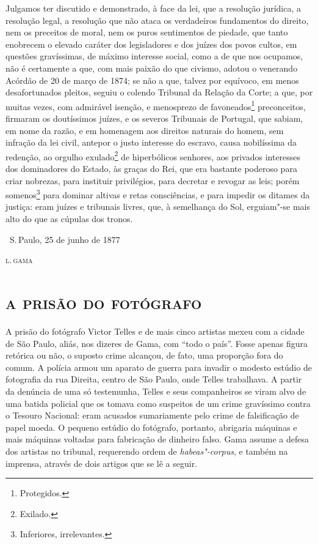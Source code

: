 Julgamos ter discutido e demonstrado, à face da lei, que a resolução
jurídica, a resolução legal, a resolução que não ataca os verdadeiros
fundamentos do direito, nem os preceitos de moral, nem os puros
sentimentos de piedade, que tanto enobrecem o elevado caráter dos
legisladores e dos juízes dos povos cultos, em questões gravíssimas, de
máximo interesse social, como a de que nos ocupamos, não é certamente a
que, com mais paixão do que civismo, adotou o venerando Acórdão de 20 de
março de 1874; se não a que, talvez por equívoco, em menos
desafortunados pleitos, seguiu o colendo Tribunal da Relação da Corte; a
que, por muitas vezes, com admirável isenção, e menosprezo de
favoneados\footnote{Protegidos.} preconceitos, firmaram os doutíssimos
juízes, e os severos Tribunais de Portugal, que sabiam, em nome da
razão, e em homenagem aos direitos naturais do homem, sem infração da
lei civil, antepor o justo interesse do escravo, causa nobilíssima da
redenção, ao orgulho exulado\footnote{Exilado.} de hiperbólicos
senhores, aos privados interesses dos dominadores do Estado, às graças
do Rei, que era bastante poderoso para criar nobrezas, para instituir
privilégios, para decretar e revogar as leis; porém somenos\footnote{
  Inferiores, irrelevantes.}
para dominar altivas e
retas consciências, e para impedir os ditames da justiça: eram juízes e
tribunais livres, que, à semelhança do Sol, erguiam"-se mais alto do que
as cúpulas dos tronos.

\bigskip

\hfill\ S.\,Paulo, 25 de junho de 1877\smallskip

\hfill\textsc{l.\,gama}

\pagebreak
\thispagestyle{empty}
\movetooddpage
\thispagestyle{empty}


\begingroup\makeatletter\@openrightfalse
\part{\textsc{a prisão do fotógrafo}}

\mbox{}\vfill
\thispagestyle{empty}
{\footnotesize\noindent
A prisão do fotógrafo Victor Telles e de mais cinco artistas mexeu
com a cidade de São Paulo, aliás, nos dizeres de Gama, com ``todo o
país''. Fosse apenas figura retórica ou não, o suposto crime alcançou, de
fato, uma proporção fora do comum. A polícia armou um aparato de guerra
para invadir o modesto estúdio de fotografia da rua Direita, centro de
São Paulo, onde Telles trabalhava. A partir da denúncia de uma só
testemunha, Telles e seus companheiros se viram alvo de uma batida
policial que os tomava como suspeitos de um crime gravíssimo contra o
Tesouro Nacional: eram acusados sumariamente pelo crime de falsificação
de papel moeda. O pequeno estúdio do fotógrafo, portanto, abrigaria
máquinas e mais máquinas voltadas para fabricação de dinheiro falso.
Gama assume a defesa dos artistas no tribunal, requerendo ordem de
\emph{habeas"-corpus}, e também na imprensa, através de dois artigos que
se lê a seguir. }
\@openrighttrue\makeatother \endgroup


